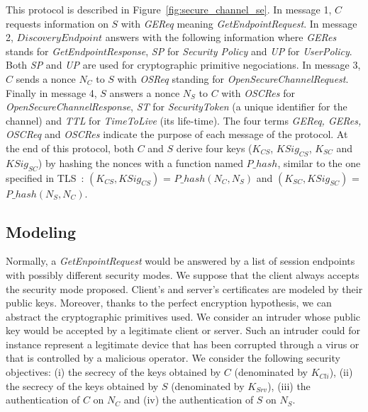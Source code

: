 This protocol is described in Figure~\ref{fig:secure_channel_se}.  In
message 1, $C$ requests information on $S$ with {\em GEReq} meaning
{\em GetEndpointRequest}.  In message 2, $DiscoveryEndpoint$ answers
with the following  information where {\em GERes} stands for {\em
  GetEndpointResponse}, {\em SP} for {\em Security Policy} and {\em
  UP} for {\em UserPolicy}.  Both {\em SP} and {\em UP} are used for
cryptographic primitive negociations.  In message 3, $C$ sends a nonce
 $N_{C}$ to $S$ with {\em OSReq} standing for {\em
  OpenSecureChannelRequest}.  Finally in message 4, $S$ answers a
nonce $N_{S}$ to $C$ with {\em OSCRes} for {\em
  OpenSecureChannelResponse}, {\em ST} for {\em SecurityToken} (a
unique identifier for the channel) and {\em TTL} for {\em TimeToLive}
(its life-time).  The four terms {\em GEReq, GERes, OSCReq} and {\em
  OSCRes} indicate the purpose of each message of the protocol.  At
  the end of this protocol, both $C$ and $S$ derive four keys ($K_{CS}$,
  $KSig_{CS}$, $K_{SC}$ and $KSig_{SC}$) by hashing the
nonces with a function named $P\_hash$, similar to the one specified
in TLS~\cite{DR08}: $(K_{CS}, KSig_{CS})$ = $P\_hash(N_{C}, N_{S})$
and $(K_{SC}, KSig_{SC})$ = $P\_hash(N_{S}, N_{C})$.

\subsection{Modeling}\label{sec:secure_channel_modeling}

Normally, a {\em GetEnpointRequest} would be answered by a list of
session endpoints with possibly different security modes. We suppose
that the client always accepts the security mode proposed.  Client's
and server's certificates are modeled by their public keys.  Moreover,
thanks to the perfect encryption hypothesis, we can abstract the
cryptographic primitives used.  We consider an intruder whose public
key would be accepted by a legitimate client or server.  Such an
intruder could for instance represent a legitimate device that has
been corrupted through a virus or that is controlled by a malicious
operator. 
We consider the following security objectives: (i) the secrecy of the
keys obtained by $C$ (denominated by $K_{Cli}$), (ii) the secrecy of
the keys obtained by $S$ (denominated by $K_{Srv}$), (iii) the
authentication of $C$ on $N_{C}$ and (iv) the authentication of $S$ on
$N_{S}$.

